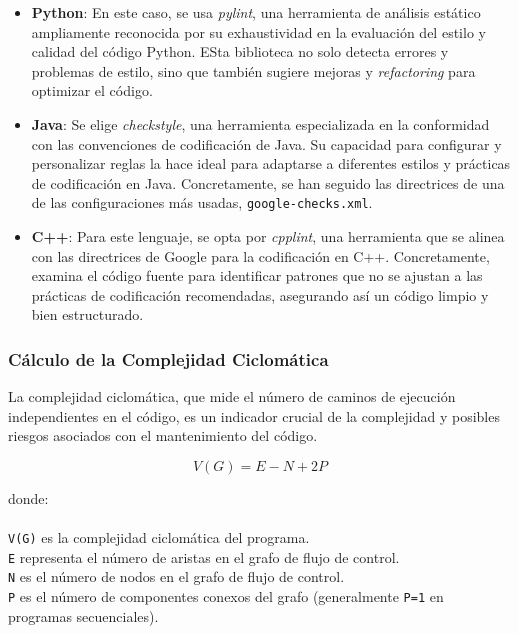 \begin{itemize}
    \item \textbf{Python}: En este caso, se usa \textit{pylint}, una herramienta de análisis estático ampliamente reconocida por su exhaustividad en la evaluación del estilo y calidad del código Python. ESta biblioteca no solo detecta errores y problemas de estilo, sino que también sugiere mejoras y \textit{refactoring} para optimizar el código.

    \item \textbf{Java}: Se elige \textit{checkstyle}, una herramienta especializada en la conformidad con las convenciones de codificación de Java. Su capacidad para configurar y personalizar reglas la hace ideal para adaptarse a diferentes estilos y prácticas de codificación en Java. Concretamente, se han seguido las directrices de una de las configuraciones más usadas, \texttt{google-checks.xml}.

    \item \textbf{C++}: Para este lenguaje, se opta por \textit{cpplint}, una herramienta que se alinea con las directrices de Google para la codificación en C++. Concretamente, examina el código fuente para identificar patrones que no se ajustan a las prácticas de codificación recomendadas, asegurando así un código limpio y bien estructurado.
\end{itemize}

\subsubsection*{Cálculo de la Complejidad Ciclomática}

La complejidad ciclomática, que mide el número de caminos de ejecución independientes en el código, es un indicador crucial de la complejidad y posibles riesgos asociados con el mantenimiento del código.

\begin{equation}
    V(G) = E - N + 2P
\end{equation}

donde: \\ \\
    \texttt{V(G)} es la complejidad ciclomática del programa. \\
    \texttt{E} representa el número de aristas en el grafo de flujo de control. \\
    \texttt{N} es el número de nodos en el grafo de flujo de control.\\
    \texttt{P} es el número de componentes conexos del grafo (generalmente \texttt{P=1} en programas secuenciales).\\

